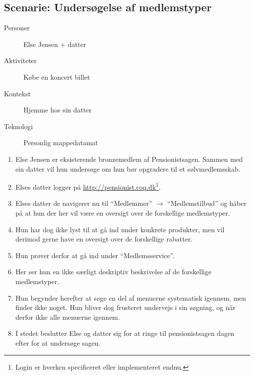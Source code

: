 \subsection{Scenarie: Undersøgelse af medlemstyper}

\begin{description}
    \item[Personer] Else Jensen + datter
    \item[Aktiviteter] Købe en koncert billet
    \item[Kontekst] Hjemme hos sin datter
    \item[Teknologi] Personlig mappedatamat
\end{description}

\begin{enumerate}
    \item Else Jensen er eksisterende bronzemedlem af Pensionistsagen. Sammen
    med sin datter vil hun undersøge om hun bør opgradere til et
    sølvmedlemsskab.
    \item Elses datter logger på
          \url{http://pensionist.coq.dk}\footnote{Login er hverken
          specificeret eller implementeret endnu.}.
    \item Elses datter de navigerer nu til ``Medlemmer'' $\to$ ``Medlemstilbud''
    og håber på at hun der her vil være en oversigt over de forskellige
    medlemstyper.
    \item Hun har dog ikke lyst til at gå ind under konkrete produkter, men vil
    derimod gerne have en oversigt over de forskellige rabatter.
    \item Hun prøver derfor at gå ind under ``Medlemsservice''.
    \item Her ser hun en ikke særligt deskriptiv beskrivelse af de forskellige
    medlemstyper.
    \item Hun begynder herefter at søge en del af menuerne systematisk igennem,
    men finder ikke noget. Hun bliver dog frusteret undervejs i sin søgning, og
    når derfor ikke alle menuerne igennem.
    \item I stedet beslutter Else og datter sig for at ringe til pensionistsagen
    dagen efter for at undersøge sagen.
\end{enumerate}

